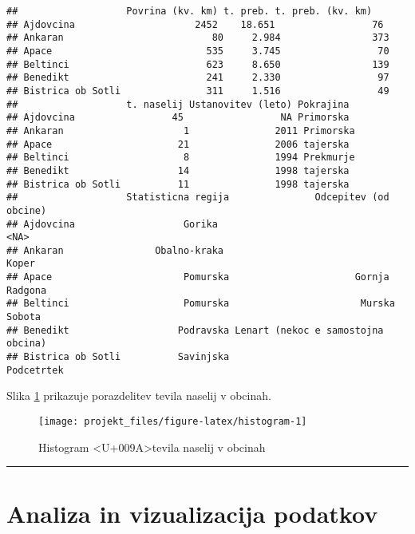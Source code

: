\documentclass[]{article}
\begin{document}
\begin{verbatim}
##                   Povrina (kv. km) t. preb. t. preb. (kv. km)
## Ajdovcina                     2452    18.651                 76
## Ankaran                          80     2.984                373
## Apace                           535     3.745                 70
## Beltinci                        623     8.650                139
## Benedikt                        241     2.330                 97
## Bistrica ob Sotli               311     1.516                 49
##                   t. naselij Ustanovitev (leto) Pokrajina
## Ajdovcina                 45                 NA Primorska
## Ankaran                     1               2011 Primorska
## Apace                      21               2006 tajerska
## Beltinci                    8               1994 Prekmurje
## Benedikt                   14               1998 tajerska
## Bistrica ob Sotli          11               1998 tajerska
##                   Statisticna regija               Odcepitev (od obcine)
## Ajdovcina                   Gorika                                <NA>
## Ankaran                Obalno-kraka                               Koper
## Apace                       Pomurska                      Gornja Radgona
## Beltinci                    Pomurska                       Murska Sobota
## Benedikt                   Podravska Lenart (nekoc e samostojna obcina)
## Bistrica ob Sotli          Savinjska                          Podcetrtek
\end{verbatim}

Slika \ref{fig:histogram} prikazuje porazdelitev tevila naselij v
obcinah.

\begin{figure}

{\centering \texttt{[image: projekt\_files/figure-latex/histogram-1]} 

}

\caption{Histogram <U+009A>tevila naselij v obcinah}\label{fig:histogram}
\end{figure}

\begin{center}\rule{0.5\linewidth}{\linethickness}\end{center}

\section{Analiza in vizualizacija
podatkov}\label{analiza-in-vizualizacija-podatkov}
\end{document}
